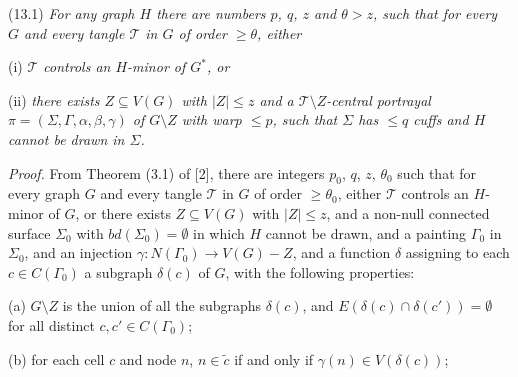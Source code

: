\stmt
(13.1) \textit{For any graph $H$ there are numbers $p$, $q$, $z$ and $\theta > z$, such that for every   $G$ and every tangle $\mathcal{T}$ in $G$ of order $\ge \theta$, either}

\hspace*{12pt}(i) \textit{$\mathcal{T}$ controls an $H$-minor of $G^*$, or}

\hspace*{12pt}(ii) \textit{there exists $Z \subseteq V(G)$ with $|Z| \le z$ and a $\mathcal{T} \setminus Z$-central portrayal $\pi = (\Sigma, \Gamma, \alpha, \beta, \gamma)$ of $G \setminus Z$ with warp $\le p$, such that $\Sigma$ has $\le q$ cuffs and $H$ cannot be drawn in $\Sigma$.}

\textit{Proof.} From Theorem (3.1) of [2], there are integers $p_0$, $q$, $z$, $\theta_0$ such that for every graph $G$ and every tangle $\mathcal{T}$ in $G$ of order $\ge \theta_0$, either $\mathcal{T}$ controls an $H$-minor of $G$, or there exists $Z \subseteq V(G)$ with $|Z| \le z$, and a non-null connected surface $\Sigma_0$ with $bd(\Sigma_0) = \emptyset$ in which $H$ cannot be drawn, and a painting $\Gamma_0$ in $\Sigma_0$, and an injection $\gamma \colon N(\Gamma_0) \to V(G) - Z$, and a function $\delta$ assigning to each $c \in C(\Gamma_0)$ a subgraph $\delta(c)$ of $G$, with the following properties:

\hspace*{12pt}(a) $G \setminus Z$ is the union of all the subgraphs $\delta(c)$, and $E(\delta(c) \cap \delta(c')) = \emptyset$ for all distinct $c, c' \in C(\Gamma_0)$;

\hspace*{12pt}(b) for each cell $c$ and node $n$, $n \in \tilde{c}$ if and only if $\gamma(n) \in V(\delta(c))$;

